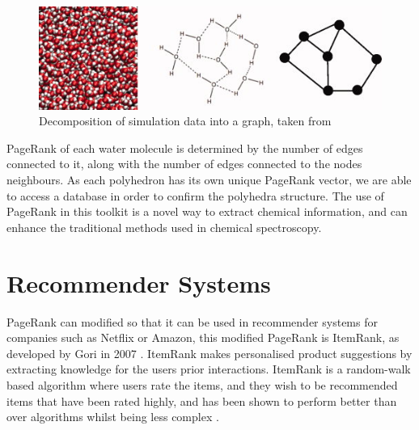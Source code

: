 \documentclass[11pt]{report}
\begin{document}
\begin{figure}[h]
\includegraphics[width=\linewidth]{Decomposition_of_simulation_date_into_a_graph_-chem.jpg}
\caption{Decomposition of simulation data into a graph, taken from \cite{JCC:JCC22917}}
\label{fig:chem}
\end{figure}

PageRank of each water molecule is determined by the number of edges connected to it, along with the number of edges connected to the nodes neighbours. As each polyhedron has its own unique PageRank vector, we are able to access a database in order to confirm the polyhedra structure. The use of PageRank in this toolkit is a novel way to extract chemical information, and can enhance the traditional methods used in chemical spectroscopy.

\section{Recommender Systems} \label{sec:recommender}
PageRank can modified so that it can be used in recommender systems for companies such as Netflix or Amazon, this modified PageRank is ItemRank, as developed by Gori in 2007 \cite{gleich2015pagerank}. ItemRank makes personalised product suggestions by extracting knowledge for the users prior interactions. ItemRank is a random-walk based algorithm where users rate the items, and they wish to be recommended items that have been rated highly, and has been shown to perform better than over algorithms whilst being less complex \cite{gori2007itemrank}.
\end{document}
